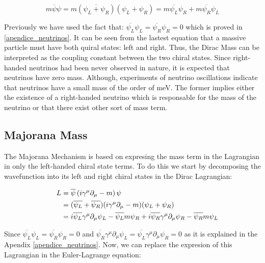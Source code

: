 \begin{equation}\label{Dirac mass term}
 m \overline{\psi} \psi = m \left( \overbar{\psi_L + \psi_R} \right) \left( \psi_L + \psi_R \right) = m \overline{\psi_L} \psi_R + m \overline{\psi_R}\psi_L
\end{equation} 

Previously we have used the fact that: $\overline{\psi_L}\psi_L = \overline{\psi_R}\psi_R = 0$ which is proved in \ref{apendice_neutrinos}. It can be seen from the lastest equation
that a massive particle must have both quiral states: left and right. Thus, the Dirac Mass can be interpreted as the coupling constant between the two chiral states. Since right-handed 
neutrinos had been never observed in nature, it is expected that neutrinos have zero mass. Although, experiments of neutrino oscillations indicate that neutrinos have a small mass of 
the order of meV. The former implies either the existence of a right-handed neutrino which is responsable for the mass of the neutrino or that there exist other sort of mass term.

\subsection{Majorana Mass}

The Majorana Mechanism is based on expresing the mass term in the Lagrangian in only the left-handed chiral state terms.
To do this we start by decomposing the wavefunction into its left and right chiral states in the Dirac Lagrangian: 


\begin{align}
  \phantom{i = j = k}
  &\begin{aligned}
    \mathllap{L} &= \overline{\psi} \left( i \gamma ^\mu \partial_{\mu} - m \right) \psi \\
    \mathllap{}  &= (\overline{\psi_L} + \overline{\psi_R})( i \gamma ^\mu \partial_{\mu} - m)(\psi_L + \psi_R) \\
     \mathllap{} &= i \overline{\psi_L}\gamma^\mu\partial_\mu \psi_L - \overline{\psi_L} m \psi_R +
     i\overline{\psi_R}\gamma^\mu \partial_\mu \psi_R - \overline{\psi_R}m\psi_L
   &\end{aligned}
\end{align}

Since $\overline{\psi_L}\psi_L = \overline{\psi_R}\psi_R = 0$ and $\overline{\psi_R}\gamma^\mu \partial_\mu \psi_L = \overline{\psi_L}\gamma^\mu\partial_\mu \psi_R = 0$
as it is explained in the Apendix \ref{apendice_neutrinos}. Now, we can replace the expresion of this Lagrangian in the Euler-Lagrange equation:


